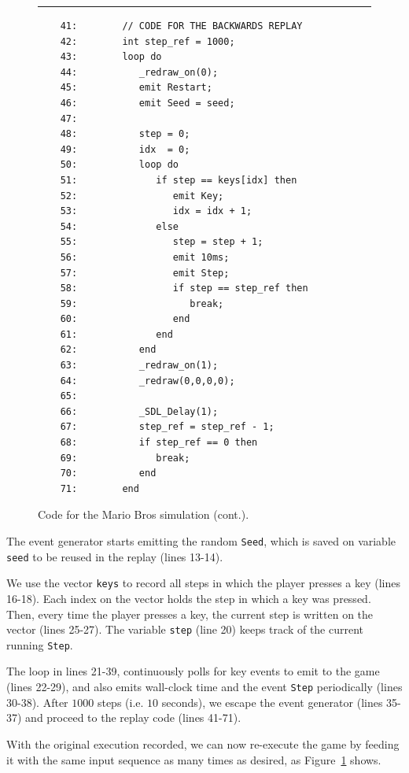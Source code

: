 \documentclass[11pt,a4paper]{article}
\newcommand{\2}{\;\;}
\newcommand{\5}{\;\;\;\;\;}
\newcommand{\code}[1] {{\small{\texttt{#1}}}}
\begin{document}
\begin{figure}[t]
\rule{15cm}{0.37pt}
{\small
\begin{verbatim}
    41:        // CODE FOR THE BACKWARDS REPLAY
    42:        int step_ref = 1000;
    43:        loop do
    44:           _redraw_on(0);
    45:           emit Restart;
    46:           emit Seed = seed;
    47:
    48:           step = 0;
    49:           idx  = 0;
    50:           loop do
    51:              if step == keys[idx] then
    52:                 emit Key;
    53:                 idx = idx + 1;
    54:              else
    55:                 step = step + 1;
    56:                 emit 10ms;
    57:                 emit Step;
    58:                 if step == step_ref then
    59:                    break;
    60:                 end
    61:              end
    62:           end
    63:           _redraw_on(1);
    64:           _redraw(0,0,0,0);
    65:
    66:           _SDL_Delay(1);
    67:           step_ref = step_ref - 1;
    68:           if step_ref == 0 then
    69:              break;
    70:           end
    71:        end
\end{verbatim}
}
\caption{ Code for the Mario Bros simulation (cont.).
\label{lst:demos:mario:4}
}
\end{figure}

The event generator starts emitting the random \code{Seed}, which is saved on 
variable \code{seed} to be reused in the replay (lines 13-14).

We use the vector \code{keys} to record all steps in which the player presses a 
key (lines 16-18).
Each index on the vector holds the step in which a key was pressed.
Then, every time the player presses a key, the current step is written on the 
vector (lines 25-27).
The variable \code{step} (line 20) keeps track of the current running 
\code{Step}.

The loop in lines 21-39, continuously polls for key events to emit to the game 
(lines 22-29), and also emits wall-clock time and the event \code{Step} 
periodically (lines 30-38).
After $1000$ steps (i.e. $10$ seconds), we escape the event generator (lines 
35-37) and proceed to the replay code (lines 41-71).

With the original execution recorded, we can now re-execute the game by feeding 
it with the same input sequence as many times as desired, as 
Figure~\ref{lst:demos:mario:4} shows.
\end{document}
